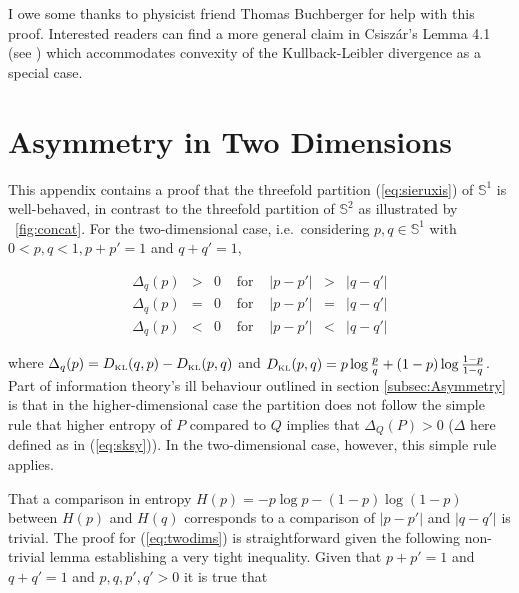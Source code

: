 \documentclass[phd,12pt,oneside]{ubcthesis}
\begin{document}
I owe some thanks to physicist friend Thomas Buchberger for help with
this proof. Interested readers can find a more general claim in
Csisz{\'a}r's Lemma 4.1 (see ) which
accommodates convexity of the Kullback-Leibler divergence as a special
case.

\chapter{Asymmetry in Two Dimensions}
\label{app:asytwodims}


This appendix contains a proof that the threefold partition
(\ref{eq:sieruxis}) of $\mathbb{S}^{1}$ is well-behaved, in contrast
to the threefold partition of $\mathbb{S}^{2}$ as illustrated by
{\igure}~\ref{fig:concat}. For the two-dimensional case, i.e.\
considering $p,q\in\mathbb{S}^{1}$ with $0<p,q<1, p+p'=1$ and
$q+q'=1$,


\begin{equation}
  \label{eq:twodims}
  \begin{array}{rclcrcl}
  \Delta_{q}(p)&>&0&\mbox{ for }&|p-p'|&>&|q-q'|\\
  \Delta_{q}(p)&=&0&\mbox{ for }&|p-p'|&=&|q-q'|\\
  \Delta_{q}(p)&<&0&\mbox{ for }&|p-p'|&<&|q-q'|
  \end{array}
\end{equation}

{\noindent}where $\Delta_{q}(p)=D_{\mbox{\tiny KL}}(q,p)-D_{\mbox{\tiny
    KL}}(p,q)$ and $D_{\mbox{\tiny
    KL}}(p,q)=p\log\frac{p}{q}+(1-p)\log\frac{1-p}{1-q}$. Part of
information theory's ill behaviour outlined in section
\ref{subsec:Asymmetry} is that in the higher-dimensional case the
partition does not follow the simple rule that higher entropy of $P$
compared to $Q$ implies that $\Delta_{Q}(P)>0$ ($\Delta$ here defined
as in (\ref{eq:sksy})). In the two-dimensional case, however, this
simple rule applies. 

That a comparison in entropy $H(p)=-p\log{}p-(1-p)\log(1-p)$ between
$H(p)$ and $H(q)$ corresponds to a comparison of $|p-p'|$ and $|q-q'|$
is trivial. The proof for (\ref{eq:twodims}) is straightforward given
the following non-trivial lemma establishing a very tight inequality.
Given that $p+p'=1$ and $q+q'=1$ and $p,q,p',q'>0$ it is true
that
\end{document}
